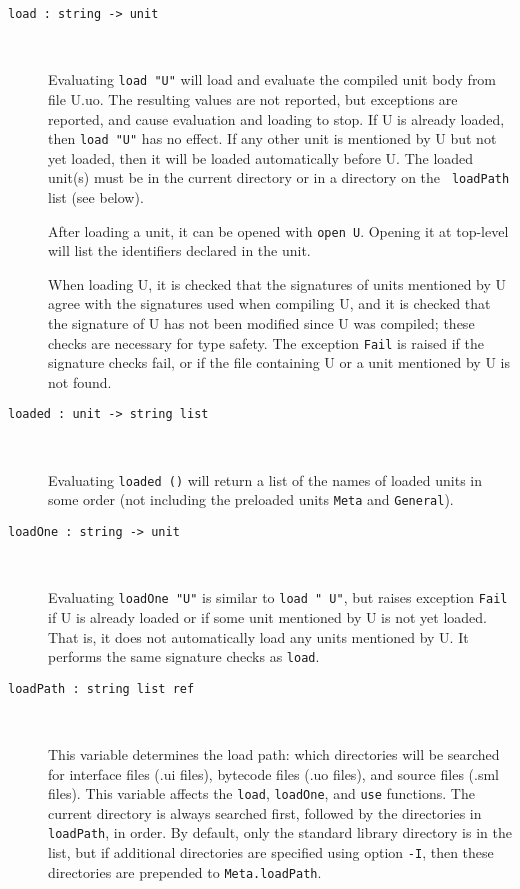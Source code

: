 \documentclass[fleqn]{article}
\begin{document}
\begin{description}
\item[{\tt load :\ string -> unit}]\mbox{ }

  Evaluating {\tt load "{\rm U}"} will load and evaluate the compiled
  unit body from file U.uo.  The resulting values are not reported,
  but exceptions are reported, and cause evaluation and loading to
  stop.  If U is already loaded, then {\tt load "{\rm U}"} has no
  effect.  If any other unit is mentioned by U but not yet loaded,
  then it will be loaded automatically before U.  The loaded unit(s)
  must be in the current directory or in a directory on the {\tt
    loadPath} list (see below).

  After loading a unit, it can be opened with {\tt open U}.  Opening
  it at top-level will list the identifiers declared in the unit.

  When loading U, it is checked that the signatures of units mentioned
  by U agree with the signatures used when compiling U, and it is
  checked that the signature of U has not been modified since U was
  compiled; these checks are necessary for type safety.  The exception
  {\tt Fail} is raised if the signature checks fail, or if the file
  containing U or a unit mentioned by U is not found.

\item[{\tt loaded :\ unit -> string list}]\mbox{ }
  
  Evaluating {\tt loaded ()} will return a list of the names of loaded
  units in some order (not including the preloaded units {\tt Meta}
  and {\tt General}).

\item[{\tt loadOne :\ string -> unit}]\mbox{ }

  Evaluating {\tt loadOne "{\rm U}"} is similar to {\tt load "{\rm
      U}"}, but raises exception {\tt Fail} if U is already loaded or
  if some unit mentioned by U is not yet loaded.  That is, it does not
  automatically load any units mentioned by U.  It performs the same
  signature checks as {\tt load}.

\item[{\tt loadPath :\ string list ref}]\mbox{ }

  This variable determines the load path: which directories will be
  searched for interface files (.ui files), bytecode files (.uo
  files), and source files (.sml files).  This variable affects the
  {\tt load}, {\tt loadOne}, and {\tt use} functions.  The current
  directory is always searched first, followed by the directories in
  {\tt loadPath}, in order.  By default, only the standard library
  directory is in the list, but if additional directories are
  specified using option {\tt -I}, then these directories are
  prepended to {\tt Meta.loadPath}.


\end{description}
\end{document}
